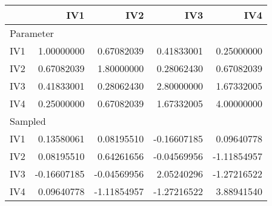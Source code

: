 \begin{longtable}{l|rrrr}
\toprule
\multicolumn{1}{l}{} & IV1 & IV2 & IV3 & IV4 \\ 
\midrule
\multicolumn{5}{l}{Parameter} \\ 
\midrule
IV1 & 1.00000000 & 0.67082039 & 0.41833001 & 0.25000000 \\ 
IV2 & 0.67082039 & 1.80000000 & 0.28062430 & 0.67082039 \\ 
IV3 & 0.41833001 & 0.28062430 & 2.80000000 & 1.67332005 \\ 
IV4 & 0.25000000 & 0.67082039 & 1.67332005 & 4.00000000 \\ 
\midrule
\multicolumn{5}{l}{Sampled} \\ 
\midrule
IV1 & 0.13580061 & 0.08195510 & -0.16607185 & 0.09640778 \\ 
IV2 & 0.08195510 & 0.64261656 & -0.04569956 & -1.11854957 \\ 
IV3 & -0.16607185 & -0.04569956 & 2.05240296 & -1.27216522 \\ 
IV4 & 0.09640778 & -1.11854957 & -1.27216522 & 3.88941540 \\ 
\bottomrule
\end{longtable}

